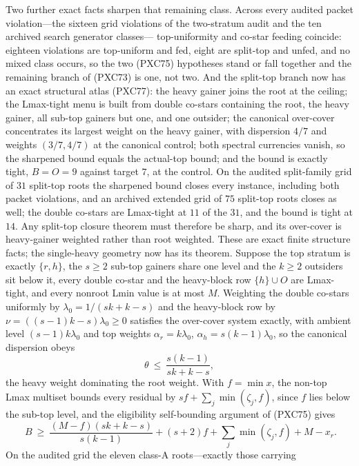 \documentclass[11pt]{article}
\begin{document}
Two further exact facts sharpen that remaining class.  Across every
audited packet violation---the sixteen grid violations of the
two-stratum audit and the ten archived search generator classes---
top-uniformity and co-star feeding coincide: eighteen violations are
top-uniform and fed, eight are split-top and unfed, and no mixed class
occurs, so the two (PXC75) hypotheses stand or fall together and the
remaining branch of (PXC73) is one, not two.  And the split-top branch
now has an exact structural atlas (PXC77): the heavy gainer joins the
root at the ceiling; the Lmax-tight menu is built from double co-stars
containing the root, the heavy gainer, all sub-top gainers but one, and
one outsider; the canonical over-cover concentrates its largest weight
on the heavy gainer, with dispersion $4/7$ and weights $(3/7,4/7)$ at
the canonical control; both spectral currencies vanish, so the sharpened
bound equals the actual-top bound; and the bound is exactly tight,
$B=O=9$ against target $7$, at the control.  On the audited split-family
grid of $31$ split-top roots the sharpened bound closes every instance,
including both packet violations, and an archived extended grid of $75$
split-top roots closes as well; the double co-stars are Lmax-tight at
$11$ of the $31$, and the bound is tight at $14$.  Any split-top closure
theorem must therefore be sharp, and its over-cover is heavy-gainer
weighted rather than root weighted.  These are exact finite structure
facts; the single-heavy geometry now has its theorem.  Suppose the top
stratum is exactly $\{r,h\}$, the $s\ge2$ sub-top gainers share one
level and the $k\ge2$ outsiders sit below it, every double co-star and
the heavy-block row $\{h\}\cup O$ are Lmax-tight, and every nonroot
Lmin value is at most $M$.  Weighting the double co-stars uniformly by
$\lambda_0=1/(sk+k-s)$ and the heavy-block row by
$\nu=((s-1)k-s)\lambda_0\ge0$ satisfies the over-cover system exactly,
with ambient level $(s-1)k\lambda_0$ and top weights
$\alpha_r=k\lambda_0$, $\alpha_h=s(k-1)\lambda_0$, so the canonical
dispersion obeys
\[
 \theta\ \le\ \frac{s(k-1)}{sk+k-s},              \tag{PXC78a}
\]
the heavy weight dominating the root weight.  With $f=\min x$, the
non-top Lmax multiset bounds every residual by
$sf+\sum_j\min(\zeta_j,f)$, since $f$ lies below the sub-top level, and
the eligibility self-bounding argument of (PXC75) gives
\[
 \boxed{\qquad
 B\ \ge\ \frac{(M-f)(sk+k-s)}{s(k-1)}+(s+2)f
 +\sum_j\min(\zeta_j,f)+M-x_r.
 \qquad}                                             \tag{PXC78}
\]
On the audited grid the eleven class-A roots---exactly those carrying
\end{document}

